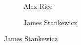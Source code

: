 \begin{frame}[plain,c]
\begin{figure}[h]
\begin{subfigure}{0.23\textwidth}
	\caption{Alex Rice}
	\end{subfigure}
	\begin{subfigure}{0.25\textwidth}
	\captionsetup{labelformat=empty}
	\centering
	\caption{James Stankewicz}
	\end{subfigure}
	\end{figure}
\end{frame}




